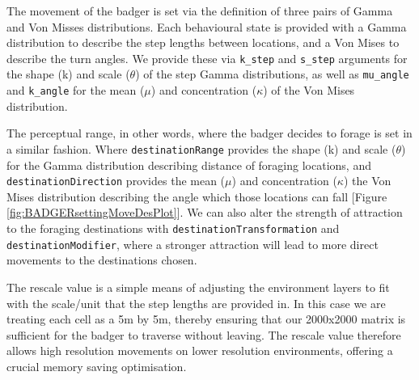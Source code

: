 \documentclass[10pt,a4paper]{article}
\begin{document}
The movement of the badger is set via the definition of three pairs of Gamma and Von Misses distributions.
Each behavioural state is provided with a Gamma distribution to describe the step lengths between locations, and a Von Mises to describe the turn angles.
We provide these via \texttt{k\_step} and \texttt{s\_step} arguments for the shape (k) and scale (\(\theta\)) of the step Gamma distributions, as well as \texttt{mu\_angle} and \texttt{k\_angle} for the mean (\(\mu\)) and concentration (\(\kappa\)) of the Von Mises distribution.

The perceptual range, in other words, where the badger decides to forage is set in a similar fashion.
Where \texttt{destinationRange} provides the shape (k) and scale (\(\theta\)) for the Gamma distribution describing distance of foraging locations, and \texttt{destinationDirection} provides the mean (\(\mu\)) and concentration (\(\kappa\)) the Von Mises distribution describing the angle which those locations can fall {[}Figure \ref{fig:BADGERsettingMoveDesPlot}{]}.
We can also alter the strength of attraction to the foraging destinations with \texttt{destinationTransformation} and \texttt{destinationModifier}, where a stronger attraction will lead to more direct movements to the destinations chosen.

The rescale value is a simple means of adjusting the environment layers to fit with the scale/unit that the step lengths are provided in.
In this case we are treating each cell as a 5m by 5m, thereby ensuring that our 2000x2000 matrix is sufficient for the badger to traverse without leaving.
The rescale value therefore allows high resolution movements on lower resolution environments, offering a crucial memory saving optimisation.
\end{document}
